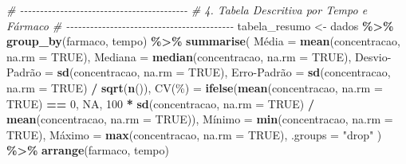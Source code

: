 \documentclass[
]{article}
\newenvironment{Shaded}{\begin{snugshade}}{\end{snugshade}}
\newcommand{\AttributeTok}[1]{\textcolor[rgb]{0.13,0.29,0.53}{#1}}
\newcommand{\CommentTok}[1]{\textcolor[rgb]{0.56,0.35,0.01}{\textit{#1}}}
\newcommand{\ConstantTok}[1]{\textcolor[rgb]{0.56,0.35,0.01}{#1}}
\newcommand{\DecValTok}[1]{\textcolor[rgb]{0.00,0.00,0.81}{#1}}
\newcommand{\FunctionTok}[1]{\textcolor[rgb]{0.13,0.29,0.53}{\textbf{#1}}}
\newcommand{\NormalTok}[1]{#1}
\newcommand{\OtherTok}[1]{\textcolor[rgb]{0.56,0.35,0.01}{#1}}
\newcommand{\SpecialCharTok}[1]{\textcolor[rgb]{0.81,0.36,0.00}{\textbf{#1}}}
\newcommand{\StringTok}[1]{\textcolor[rgb]{0.31,0.60,0.02}{#1}}
\begin{document}
\begin{Shaded}
\begin{Highlighting}[]
\CommentTok{\# {-}{-}{-}{-}{-}{-}{-}{-}{-}{-}{-}{-}{-}{-}{-}{-}{-}{-}{-}{-}{-}{-}{-}{-}{-}{-}{-}{-}{-}{-}{-}{-}{-}{-}{-}{-}{-}{-}{-}{-}{-}{-}}
\CommentTok{\# 4. Tabela Descritiva por Tempo e Fármaco}
\CommentTok{\# {-}{-}{-}{-}{-}{-}{-}{-}{-}{-}{-}{-}{-}{-}{-}{-}{-}{-}{-}{-}{-}{-}{-}{-}{-}{-}{-}{-}{-}{-}{-}{-}{-}{-}{-}{-}{-}{-}{-}{-}{-}{-}}
\NormalTok{tabela\_resumo }\OtherTok{\textless{}{-}}\NormalTok{ dados }\SpecialCharTok{\%\textgreater{}\%}
  \FunctionTok{group\_by}\NormalTok{(farmaco, tempo) }\SpecialCharTok{\%\textgreater{}\%}
  \FunctionTok{summarise}\NormalTok{(}
\NormalTok{    Média }\OtherTok{=} \FunctionTok{mean}\NormalTok{(concentracao, }\AttributeTok{na.rm =} \ConstantTok{TRUE}\NormalTok{),}
    \AttributeTok{Mediana =} \FunctionTok{median}\NormalTok{(concentracao, }\AttributeTok{na.rm =} \ConstantTok{TRUE}\NormalTok{),}
    \StringTok{\textasciigrave{}}\AttributeTok{Desvio{-}Padrão}\StringTok{\textasciigrave{}} \OtherTok{=} \FunctionTok{sd}\NormalTok{(concentracao, }\AttributeTok{na.rm =} \ConstantTok{TRUE}\NormalTok{),}
    \StringTok{\textasciigrave{}}\AttributeTok{Erro{-}Padrão}\StringTok{\textasciigrave{}} \OtherTok{=} \FunctionTok{sd}\NormalTok{(concentracao, }\AttributeTok{na.rm =} \ConstantTok{TRUE}\NormalTok{) }\SpecialCharTok{/} \FunctionTok{sqrt}\NormalTok{(}\FunctionTok{n}\NormalTok{()),}
    \StringTok{\textasciigrave{}}\AttributeTok{CV(\%)}\StringTok{\textasciigrave{}} \OtherTok{=} \FunctionTok{ifelse}\NormalTok{(}\FunctionTok{mean}\NormalTok{(concentracao, }\AttributeTok{na.rm =} \ConstantTok{TRUE}\NormalTok{) }\SpecialCharTok{==} \DecValTok{0}\NormalTok{, }\ConstantTok{NA}\NormalTok{,}
                     \DecValTok{100} \SpecialCharTok{*} \FunctionTok{sd}\NormalTok{(concentracao, }\AttributeTok{na.rm =} \ConstantTok{TRUE}\NormalTok{) }\SpecialCharTok{/} \FunctionTok{mean}\NormalTok{(concentracao, }\AttributeTok{na.rm =} \ConstantTok{TRUE}\NormalTok{)),}
\NormalTok{    Mínimo }\OtherTok{=} \FunctionTok{min}\NormalTok{(concentracao, }\AttributeTok{na.rm =} \ConstantTok{TRUE}\NormalTok{),}
\NormalTok{    Máximo }\OtherTok{=} \FunctionTok{max}\NormalTok{(concentracao, }\AttributeTok{na.rm =} \ConstantTok{TRUE}\NormalTok{),}
    \AttributeTok{.groups =} \StringTok{"drop"}
\NormalTok{  ) }\SpecialCharTok{\%\textgreater{}\%}
  \FunctionTok{arrange}\NormalTok{(farmaco, tempo)}
\end{Highlighting}
\end{Shaded}
\end{document}
